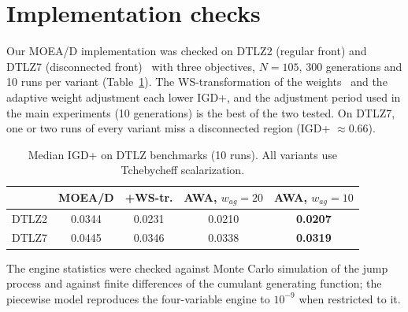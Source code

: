 \documentclass[journal]{IEEEtran}
\theoremstyle{remark}
\begin{document}
\appendices
\section{Implementation checks}
Our MOEA/D implementation was checked on DTLZ2 (regular front) and DTLZ7 (disconnected
front)~\cite{Deb2005DTLZ} with three objectives, $N = 105$, 300 generations and 10 runs per variant
(Table~\ref{tab:dtlz}). The WS-transformation of the weights~\cite{Qi2014} and the adaptive weight
adjustment each lower IGD+, and the adjustment period used in the main experiments (10 generations)
is the best of the two tested. On DTLZ7, one or two runs of every variant miss a disconnected region
(IGD+ $\approx 0.66$).

\begin{table}[h]
\caption{Median IGD+ on DTLZ benchmarks (10 runs). All variants use Tchebycheff scalarization.}
\setlength{\tabcolsep}{3pt}
\label{tab:dtlz}
\centering
\footnotesize
\begin{tabular}{lcccc}
\toprule
 & MOEA/D & +WS-tr. & AWA, $w_{ag}{=}20$ & AWA, $w_{ag}{=}10$\\
\midrule
DTLZ2 & 0.0344 & 0.0231 & 0.0210 & \textbf{0.0207}\\
DTLZ7 & 0.0445 & 0.0346 & 0.0338 & \textbf{0.0319}\\
\bottomrule
\end{tabular}
\end{table}

The engine statistics were checked against Monte Carlo simulation
of the jump process and against finite differences of the cumulant generating function; the
piecewise model reproduces the four-variable engine to $10^{-9}$ when restricted to it.



\end{document}
